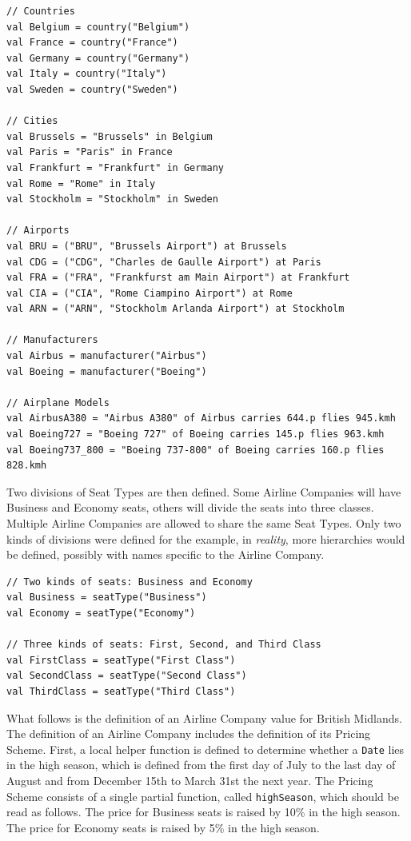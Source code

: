 \documentclass[a4paper]{article}
\newcommand{\cc}[1]{\texttt{#1}}
\begin{document}
\begin{lstlisting}
// Countries
val Belgium = country("Belgium")
val France = country("France")
val Germany = country("Germany")
val Italy = country("Italy")
val Sweden = country("Sweden")

// Cities
val Brussels = "Brussels" in Belgium
val Paris = "Paris" in France
val Frankfurt = "Frankfurt" in Germany
val Rome = "Rome" in Italy
val Stockholm = "Stockholm" in Sweden

// Airports
val BRU = ("BRU", "Brussels Airport") at Brussels
val CDG = ("CDG", "Charles de Gaulle Airport") at Paris
val FRA = ("FRA", "Frankfurst am Main Airport") at Frankfurt
val CIA = ("CIA", "Rome Ciampino Airport") at Rome
val ARN = ("ARN", "Stockholm Arlanda Airport") at Stockholm

// Manufacturers
val Airbus = manufacturer("Airbus")
val Boeing = manufacturer("Boeing")

// Airplane Models
val AirbusA380 = "Airbus A380" of Airbus carries 644.p flies 945.kmh
val Boeing727 = "Boeing 727" of Boeing carries 145.p flies 963.kmh
val Boeing737_800 = "Boeing 737-800" of Boeing carries 160.p flies 828.kmh
\end{lstlisting}

Two divisions of Seat Types are then defined.
Some Airline Companies will have Business and Economy seats, others will divide the seats into three classes.
Multiple Airline Companies are allowed to share the same Seat Types.
Only two kinds of divisions were defined for the example, in \emph{reality}, more hierarchies would be defined, possibly with names specific to the Airline Company.

\begin{lstlisting}
// Two kinds of seats: Business and Economy
val Business = seatType("Business")
val Economy = seatType("Economy")

// Three kinds of seats: First, Second, and Third Class
val FirstClass = seatType("First Class")
val SecondClass = seatType("Second Class")
val ThirdClass = seatType("Third Class")
\end{lstlisting}

What follows is the definition of an Airline Company value for British Midlands.
The definition of an Airline Company includes the definition of its Pricing Scheme.
First, a local helper function is defined to determine whether a \cc{Date} lies in the high season, which is defined from the first day of July to the last day of August and from December 15th to March 31st the next year.
The Pricing Scheme consists of a single partial function, called \cc{highSeason}, which should be read as follows.
The price for Business seats is raised by 10\% in the high season.
The price for Economy seats is raised by 5\% in the high season.
\end{document}
